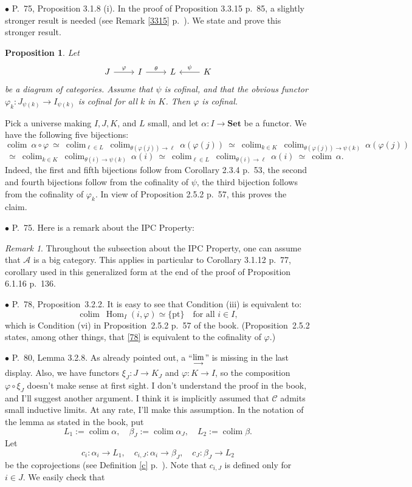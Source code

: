 \documentclass[12pt]{article}
\newtheorem{prop}[thm]{Proposition}
\theoremstyle{remark}%
\newtheorem{rk}[thm]{Remark}
\newcommand{\bu}{\bullet}
\newcommand{\n}{\noindent}
\newcommand{\A}{\mathcal A}
\newcommand{\C}{\mathcal C}
\newcommand{\Set}{\textbf{Set}}
\newcommand{\p}{\varphi}
\newcommand{\pt}{\{\text{pt}\}}
\newcommand{\pr}{Proposition}
\newcommand{\colim}{\operatornamewithlimits{\underset{\longrightarrow}{lim}}}
\DeclareMathOperator*{\coli}{colim}
\DeclareMathOperator*{\co}{colim}
\DeclareMathOperator{\h}{Hom}
\begin{document}
\n$\bu$ P.~75, Proposition 3.1.8 (i). In the proof of Proposition 3.3.15 p.~85, a slightly stronger result is needed (see Remark \ref{3315} p.~\pageref{3315}). We state and prove this stronger result. 
%
\begin{prop}\label{318i} 
% 
Let 
$$
\begin{tikzcd}
J\ar{r}{\p}&I\ar{r}{\theta}&L&K\ar{l}[swap]{\psi}
\end{tikzcd}
$$
be a diagram of categories. Assume that $\psi$ is cofinal, and that the obvious functor $\p_k:J_{\psi(k)}\to I_{\psi(k)}$ is cofinal for all $k$ in $K$. Then $\p$ is cofinal. 
% 
\end{prop} 
% 
\n{\em Proof.} Pick a universe making $I,J,K$, and $L$ small, and let $\alpha:I\to\Set$ be a functor. We have the following five bijections:
$$
\coli\ \alpha\circ\p\ \simeq\ 
%
\coli_{\ell\in L}\ \coli_{\theta(\p(j))\to\ell}\ \alpha(\p(j))\ \simeq\ 
%
\coli_{k\in K}\ \coli_{\theta(\p(j))\to\psi(k)}\ \alpha(\p(j))
$$
$$
\ \simeq\ \coli_{k\in K}\ \coli_{\theta(i)\to\psi(k)}\ \alpha(i)\ \simeq\ 
%
\coli_{\ell\in L}\ \coli_{\theta(i)\to\ell}\ \alpha(i)\ \simeq\ 
%
\coli\ \alpha.
$$
Indeed, the first and fifth bijections follow from Corollary 2.3.4 p.~53, the second and fourth bijections follow from the cofinality of $\psi$, the third bijection follows from the cofinality of $\p_k$. In view of Proposition 2.5.2 p.~57, this proves the claim. 


\n$\bu$ P.~75. Here is a remark about the IPC Property: 
% 
\begin{rk}\label{ipc} 
Throughout the subsection about the IPC Property, one can assume that $\A$ is a big category. This applies in particular to Corollary 3.1.12 p.~77, corollary used in this generalized form at the end of the proof of Proposition 6.1.16 p.~136. 
\end{rk} 


\n$\bu$ P.~78, \pr\ 3.2.2. It is easy to see that Condition (iii) is equivalent to: 
%
\begin{equation}\label{78} 
\co\ \h_I(i,\p)\simeq\pt\quad\text{for all }i\in I, 
\end{equation} 
% 
which is Condition (vi) in \pr\ 2.5.2 p.~57 of the book. (\pr\ 2.5.2 states, among other things, that \eqref{78} is equivalent to the cofinality of $\p$.) 


\n$\bu$ P.~80, Lemma 3.2.8. As already pointed out, a ``$\displaystyle\colim$'' is missing in the last display. Also, we have functors $\xi_J:J\to K_J$ and $\varphi:K\to I$, so the composition $\varphi\circ\xi_J$ doesn't make sense at first sight. I don't understand the proof in the book, and I'll suggest another argument. I think it is implicitly assumed that $\C$ admits small inductive limits. At any rate, I'll make this assumption. In the notation of the lemma as stated in the book, put 
$$
L_1:=\coli\alpha,\quad
\beta_J:=\coli\alpha_J,\quad
L_2:=\coli\beta.
$$
Let 
$$
c_i:\alpha_i\to L_1,\quad 
c_{i,J}:\alpha_i\to\beta_J,\quad 
c_J:\beta_J\to L_2
$$
be the coprojections (see Definition \ref{c} p.~\pageref{c}). Note that $c_{i,J}$ is defined only for $i\in J$. We easily check that 
\end{document}

